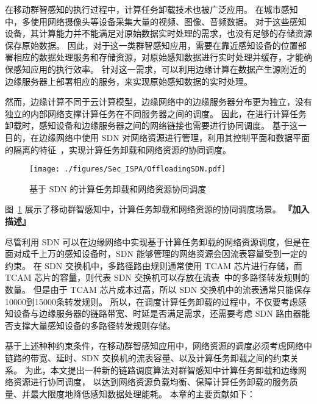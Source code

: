 在移动群智感知的执行过程中，计算任务卸载技术也被广泛应用。
在城市感知中，多使用网络摄像头等设备采集大量的视频、图像、音频数据。
对于这些感知设备，其计算能力并不能满足对原始数据实时处理的需求，也没有足够的存储资源保存原始数据。
因此，对于这一类群智感知应用，需要在靠近感知设备的位置部署相应的数据处理服务和存储资源，对原始感知数据进行实时处理并缓存，才能确保感知应用的执行效率。
针对这一需求，可以利用边缘计算在数据产生源附近的边缘服务器上部署相应的服务，来实现原始感知数据的实时处理。

然而，边缘计算不同于云计算模型，边缘网络中的边缘服务器分布更为独立，没有独立的内部网络支撑计算任务在不同服务器之间的调度。
因此，在进行计算任务卸载时，感知设备和边缘服务器之间的网络链接也需要进行协同调度。
基于这一目的，在边缘网络中使用 SDN 对网络资源进行管理，利用其控制平面和数据平面的隔离的特征~\cite{Committee:2012un}，实现计算任务卸载和网络资源的协同调度。


\begin{figure}[!h]
  \centering
  \texttt{[image: ./figures/Sec\_ISPA/OffloadingSDN.pdf]}
  \vspace{-1em}
  \caption{基于 SDN 的计算任务卸载和网络资源协同调度}
  \vspace{-1em}
  \label{fig_OffloadingSDN}
\end{figure}

图~\ref{fig_OffloadingSDN} 展示了移动群智感知中，计算任务卸载和网络资源的协同调度场景。
\textbf{『加入描述』}

尽管利用 SDN 可以在边缘网络中实现基于计算任务卸载的网络资源调度，但是在面对成千上万的感知设备时，SDN 能够管理的网络资源会因流表容量受到一定的约束。
在 SDN 交换机中，多路径路由规则通常使用 TCAM 芯片进行存储，而 TCAM 芯片的容量，则代表 SDN 交换机可以存放在流表~\cite{Dasgupta:2012:DMD:2400771.2401550}中的多路径转发规则的数量。
但是由于 TCAM 芯片成本过高，所以 SDN 交换机中的流表通常只能保存10000到15000条转发规则。
所以，在调度计算任务卸载的过程中，不仅要考虑感知设备与边缘服务器的链路带宽、时延是否满足需求，还需要考虑 SDN 路由器能否支撑大量感知设备的多路径转发规则存储。

基于上述种种约束条件，在移动群智感知应用中，网络资源的调度必须考虑网络中链路的带宽、延时、SDN 交换机的流表容量、以及计算任务卸载之间的约束关系。
为此，本文提出一种新的链路调度算法对群智感知中计算任务卸载和边缘网络资源进行协同调度，
以达到网络资源负载均衡、保障计算任务卸载的服务质量、并最大限度地降低感知数据处理能耗。
本章的主要贡献如下：

